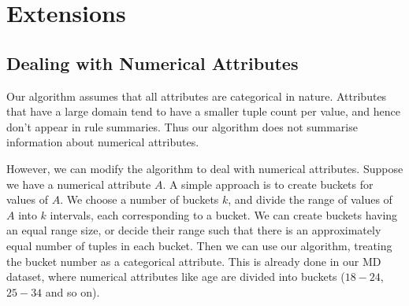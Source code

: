 

\section{Extensions}\label{sec:extensions}
\subsection{Dealing with Numerical Attributes}\label{sec:extensions-numerical}
Our algorithm assumes that all attributes are categorical in nature. Attributes that have a large domain tend to have a smaller tuple count per value, and hence don't appear in rule summaries. Thus our algorithm does not summarise information about numerical attributes. 

However, we can modify the algorithm to deal with numerical attributes. Suppose we have a numerical attribute $A$. A simple approach is to create buckets for values of $A$. We choose a number of buckets $k$, and divide the range of values of $A$ into $k$ intervals, each corresponding to a bucket. We can create buckets having an equal range size, or decide their range such that there is an approximately equal number of tuples in each bucket. Then we can use our algorithm, treating the bucket number as a categorical attribute. This is already done in our MD dataset, where numerical attributes like age are divided into buckets ($18-24$, $25-34$ and so on).

\begin{comment}
The distribution of values for the $A$ may not be similar in different parts of the table. For instance, we may create buckets have approximately equal numbers of tuples in the table. But then suppose a user tries to expand a rule $r$. The part of the table covered by $r$ might have a very different distribution of age values. For instance, in our MD dataset, if the user looks at people who own a house, their age distribution would be different from that of people who are still renting an apartment. To prevent the buckets from getting a skewed distribution when expanding $r$, we could recompute the bucket ranges every time the user expands a rule, and use the new bucket ranges to determine which rules to display upon expansion. 

ask : we should mention this right up front when we're describing the problem.
\end{comment}

